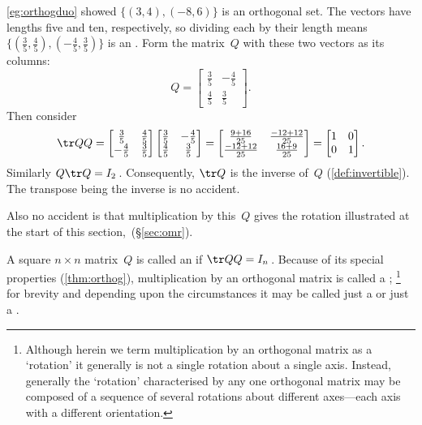 \begin{example} \label{eg:}
\autoref{eg:orthogduo} showed \(\{(3,4),(-8,6)\}\) is an orthogonal set.  
The vectors have lengths five and ten, respectively, so dividing each by their length means \(\{(\frac35,\frac45),(-\frac45,\frac35)\}\) is an .
Form the matrix~\(Q\) with these two vectors as its columns:
\[Q%
=\begin{bmatrix} \frac35&-\frac45\\\frac45&\frac35 \end{bmatrix}.\]
Then consider
\begin{equation*}
\tr QQ=\begin{bmatrix} \frac35&\frac45\\-\frac45&\frac35 \end{bmatrix}
\begin{bmatrix} \frac35&-\frac45\\\frac45&\frac35 \end{bmatrix}
=\begin{bmatrix} \frac{9+16}{25}&\frac{-12+12}{25}\\
\frac{-12+12}{25}&\frac{16+9}{25} \end{bmatrix}
=\begin{bmatrix} 1&0\\0&1 \end{bmatrix}.
\end{equation*}
Similarly \(Q\tr Q=I_2\)\,.
Consequently, \(\tr Q\) is the inverse of~\(Q\) (\autoref{def:invertible}).  
The transpose being the inverse is no accident.

Also no accident is that multiplication by this~\(Q\) gives the rotation illustrated at the start of this section,~(\S\ref{sec:omr}).
\end{example}




\begin{comment}
Could change this definition to $Q$~is {invertible} and $Q^{-1}=\tr Q$.  Then prove equivalence.  Use this for now.
\end{comment}

\begin{definition} \label{def:orthog} 
A square \(n\times n\) matrix~\(Q\) is called an  if \(\tr QQ=I_n\)\,.
Because of its special properties (\autoref{thm:orthog}),
multiplication by an orthogonal matrix is called a ;  
\footnote{Although herein we term multiplication by an orthogonal matrix as a `rotation' it generally is not a single rotation about a single axis.  
Instead, generally the `rotation' characterised by any one orthogonal matrix may be composed of a sequence of several rotations about different axes---each axis with a different orientation.}
for brevity and depending upon the circumstances it may be called just a  or just a .
\end{definition}




